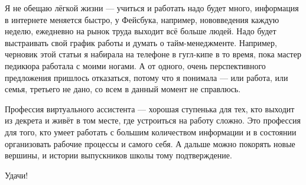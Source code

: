 Я не обещаю лёгкой жизни --- учиться и работать надо будет много, информация в интернете меняется быстро, у Фейсбука, например, нововведения каждую неделю, ежедневно на рынок труда выходит всё больше людей. Надо будет выстраивать свой график работы и думать о тайм-менеджменте. Например, черновик этой статьи я набирала на телефоне в гугл-кипе в то время, пока мастер педикюра работала с моими ногами. А от одного, очень перспективного предложения пришлось отказаться, потому что я понимала --- или работа, или семья, третьего не дано, со всем в данный момент не справлюсь.

Профессия виртуального ассистента --- хорошая ступенька для тех, кто выходит из декрета и живёт в том месте, где устроиться на работу сложно. Это профессия для того, кто умеет работать с большим количеством информации и в состоянии организовать рабочие процессы и самого себя. А дальше можно покорять новые вершины, и истории выпускников школы тому подтверждение.

Удачи!
